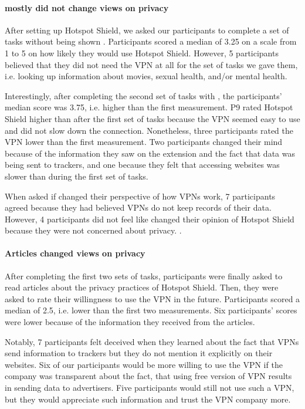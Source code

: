 \paragraph{\tool mostly did not change views on privacy}

After setting up Hotspot Shield, we asked our participants to complete a set of tasks without being shown \tool. Participants scored a median of 3.25 on a scale
from 1 to 5 on how likely they would use Hotspot Shield. However, 5 participants believed that they did not need the VPN at all for the set of tasks we gave them, i.e. looking up information about movies, sexual health, and/or mental health. 

Interestingly, after completing the second set of tasks with \tool, the participants' median score was 3.75, i.e. higher than the first measurement. P9 rated Hotspot Shield higher than after the first set of tasks because the VPN seemed easy to use and did not slow down the connection. Nonetheless, three participants rated the VPN lower than the
first measurement. Two participants changed their mind because of the information they saw on the extension and the fact that data was being sent to trackers, and one because
they felt that accessing websites was slower than during the first set of
tasks.

When asked if \tool changed their perspective of how VPNs work, 7
participants agreed because they had believed VPNs do not keep records of their data.  However, 4 participants did not feel like \tool changed their opinion of Hotspot Shield because they were not concerned about privacy. .

\paragraph{Articles changed views on privacy}

After completing the first two sets of tasks, participants were finally asked to read articles
about the privacy practices of Hotspot Shield. Then, they were asked to rate
their willingness to use the VPN in the future. Participants scored a median
of 2.5, i.e. lower than the first two measurements. Six participants' scores were
lower because of the information they received from the articles.

Notably, 7 participants felt deceived when they learned about the fact that
VPNs send information to trackers but they do not mention it explicitly on
their websites. Six of our participants would be more willing to use the VPN
if the company was transparent about the fact, that using free version of VPN
results in sending data to advertisers.  Five participants would still not use such a
VPN, but they would appreciate such information and trust the VPN company
more.

